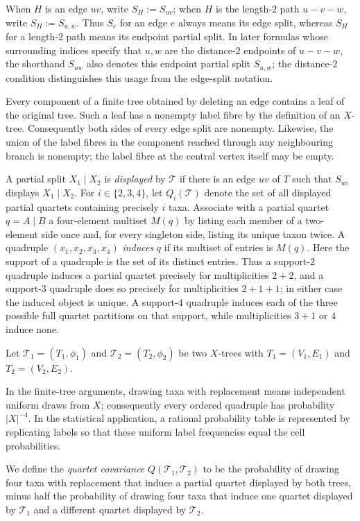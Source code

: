 \documentclass[12pt]{article}
\begin{document}
When $H$ is an edge $uv$, write $S_H:=S_{uv}$; when $H$ is the
length-$2$ path $u-v-w$, write $S_H:=S_{u,w}$.  Thus $S_e$ for an edge
$e$ always means its edge split, whereas $S_H$ for a length-$2$ path means
its endpoint partial split.  In later formulas whose surrounding indices
specify that $u,w$ are the distance-$2$ endpoints of $u-v-w$, the shorthand
$S_{uw}$ also denotes this endpoint partial split $S_{u,w}$; the
distance-$2$ condition distinguishes this usage from the edge-split notation.

Every component of a finite tree obtained by deleting an edge contains a
leaf of the original tree.  Such a leaf has a nonempty label fibre by the
definition of an $X$-tree.  Consequently both sides of every edge split are
nonempty.  Likewise, the union of the label fibres in the component reached
through any neighbouring branch is nonempty; the label fibre at the central
vertex itself may be empty.

A partial split $X_1\mid X_2$ is \emph{displayed} by $\mathcal T$ if
there is an edge $uv$ of $T$ such that $S_{uv}$ displays
$X_1\mid X_2$.  For $i\in\{2,3,4\}$, let $Q_i(\mathcal T)$ denote the
set of all displayed partial quartets containing precisely $i$ taxa.
Associate with a partial quartet $q=A\mid B$ a four-element multiset
$M(q)$ by listing each member of a two-element side once and, for every
singleton side, listing its unique taxon twice.  A quadruple
$(x_1,x_2,x_3,x_4)$ \emph{induces} $q$ if its multiset of entries is
$M(q)$.  Here the support of a quadruple is the set of its distinct entries.
Thus a support-$2$ quadruple induces a partial quartet precisely
for multiplicities $2+2$, and a support-$3$ quadruple does so precisely for
multiplicities $2+1+1$; in either case the induced object is unique.  A
support-$4$ quadruple induces each of the three possible full quartet
partitions on that support, while multiplicities $3+1$ or $4$ induce none.

Let $\mathcal T_1=(T_1,\phi_1)$ and
$\mathcal T_2=(T_2,\phi_2)$ be two $X$-trees with
$T_1=(V_1,E_1)$ and $T_2=(V_2,E_2)$.

In the finite-tree arguments, drawing taxa with replacement means
independent uniform draws from $X$; consequently every ordered quadruple has
probability $|X|^{-4}$.  In the statistical application, a rational
probability table is represented by replicating labels so that these uniform
label frequencies equal the cell probabilities.

We define the \emph{quartet covariance} $Q(\mathcal T_1,\mathcal T_2)$
to be the probability of drawing four taxa with replacement that induce
a partial quartet displayed by both trees, minus half the probability
of drawing four taxa that induce one quartet displayed by $\mathcal T_1$
and a different quartet displayed by $\mathcal T_2$.
\end{document}
